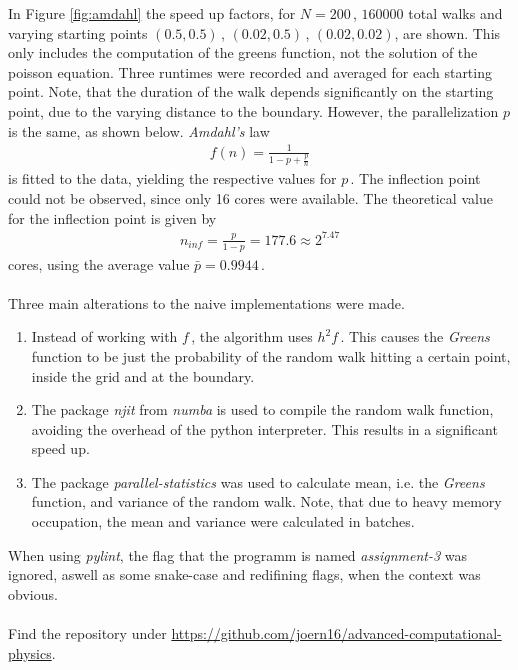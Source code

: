 \documentclass[english, 10pt,a4paper,oneside,headinclude,footinclude,BCOR5mm]{scrartcl}
\begin{document}
\noindent
In Figure \ref{fig:amdahl} the speed up factors, for $N=200$\,, $160000$ total walks and 
varying starting points $(0.5,0.5)$\,, $(0.02,0.5)$\,, $(0.02,0.02)$, are shown.
This only includes the computation of the greens function, not the solution of the poisson equation.
Three runtimes were recorded and averaged for each starting point. Note, that the duration of the 
walk depends significantly on the starting point, due to the varying distance to the boundary.
However, the parallelization $p$ is the same, as shown below. \textit{Amdahl's} law  
\begin{align}
  f(n) = \frac{1}{1-p + \frac{p}{n}}
\end{align}
is fitted to the data, yielding the respective values for $p$\,. The inflection point could not be observed,
since only 16 cores were available. The theoretical value for the inflection point is given by
\begin{align}
  n_{inf} = \frac{p}{1-p}= 177.6\approx 2^{7.47}
\end{align}
cores, using the average value $\bar{p} = 0.9944$\,.
\\\\
Three main alterations to the naive implementations were made. 
\begin{enumerate}
  \item Instead of working with $f$\,, the algorithm uses $h^2 f$\,. This causes the \textit{Greens} function to 
    be just the probability of the random walk hitting a certain point, inside the grid and at the boundary.
  \item The package \textit{njit} from \textit{numba} is used to compile the random walk function, avoiding 
    the overhead of the python interpreter. This results in a significant speed up.
  \item The package \textit{parallel-statistics} was used to calculate mean, i.e. the \textit{Greens} function, and variance of 
    the random walk. Note, that due to heavy memory occupation, the mean and variance were calculated in batches.
\end{enumerate}
\noindent
When using \textit{pylint}, the flag that the programm is named \textit{assignment-3} was ignored,
aswell as some snake-case and redifining flags, when the context was obvious. 
\\\\
Find the repository under \url{https://github.com/joern16/advanced-computational-physics}.



%

\end{document}
